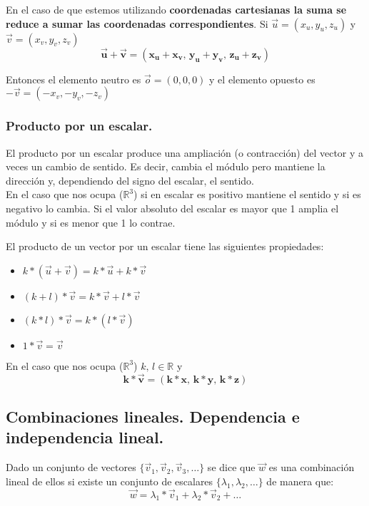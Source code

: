 \documentclass[a4paper,11pt,answers]{exam}
\begin{document}
En el caso de que estemos utilizando \textbf{coordenadas cartesianas la suma se reduce a sumar las coordenadas correspondientes}. Si $\vec u = (x_u, y_u, z_u)$ y $\vec v = (x_v, y_v, z_v)$
\[\boldsymbol{\vec u + \vec v = (x_u + x_v,\,y_u + y_v,\, z_u + z_v)}\]

Entonces el elemento neutro es $\vec o = (0,0,0)$ y el elemento opuesto es $-\vec v = (-x_v, -y_v, -z_v)$

\subsubsection{Producto por un escalar.}
El producto por un escalar produce una ampliación (o contracción) del vector y a veces un cambio de sentido. Es decir, cambia el módulo pero mantiene la dirección y, dependiendo del signo del escalar, el sentido.\\

En el caso que nos ocupa ($\mathbb{R}^3$) si en escalar es positivo mantiene el sentido y si es negativo lo cambia. Si el valor absoluto del escalar es mayor que 1 amplia el módulo y si es menor que 1 lo contrae.
\begin{center}
\end{center}

El producto de un vector por un escalar tiene las siguientes propiedades:
\begin{itemize}
	\item $k*(\vec u + \vec v) = k*\vec u + k*\vec v$
	\item $(k+l)*\vec v = k*\vec v + l*\vec v$
	\item $(k*l)*\vec v = k*(l*\vec v)$
	\item $1*\vec v = \vec v$
\end{itemize}
En el caso que nos ocupa ($\mathbb{R}^3$) $k,\,l \in \mathbb{R}$ y
\[\boldsymbol{k*\vec v = (k*x,\, k*y,\, k*z)}\]

\subsection{Combinaciones lineales. Dependencia e independencia lineal.}
Dado un conjunto de vectores $\{\vec{v}_1, \vec v_2, \vec v_3, \dots\}$ se dice que $\vec w$ es una combinación lineal de ellos si existe un conjunto de escalares $\{\lambda_1, \lambda_2, \dots\}$ de manera que:
\[\vec w = \lambda_1 * \vec v_1 + \lambda_2 *\vec v_2 + \dots\]
\end{document}
